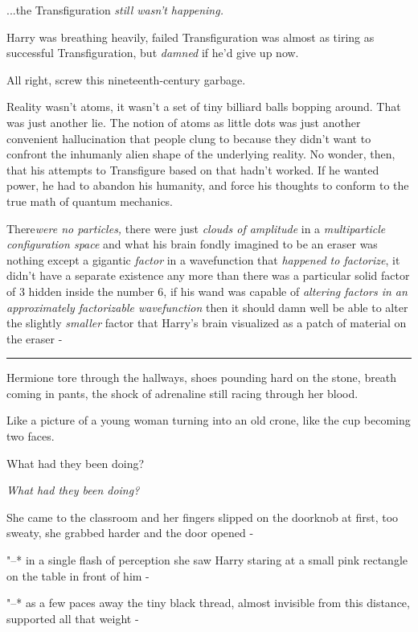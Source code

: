 ...the Transfiguration \emph{still wasn't happening.}

Harry was breathing heavily, failed Transfiguration was almost as tiring
as successful Transfiguration, but \emph{damned} if he'd give up now.

All right, screw this nineteenth-century garbage.

Reality wasn't atoms, it wasn't a set of tiny billiard balls bopping
around. That was just another lie. The notion of atoms as little dots
was just another convenient hallucination that people clung to because
they didn't want to confront the inhumanly alien shape of the underlying
reality. No wonder, then, that his attempts to Transfigure based on that
hadn't worked. If he wanted power, he had to abandon his humanity, and
force his thoughts to conform to the true math of quantum mechanics.

There\emph{were no particles,} there were just \emph{clouds of
amplitude} in a \emph{multiparticle configuration space} and what his
brain fondly imagined to be an eraser was nothing except a gigantic
\emph{factor} in a wavefunction that \emph{happened to factorize}, it
didn't have a separate existence any more than there was a particular
solid factor of 3 hidden inside the number 6, if his wand was capable of
\emph{altering factors in an approximately factorizable wavefunction}
then it should damn well be able to alter the slightly \emph{smaller}
factor that Harry's brain visualized as a patch of material on the
eraser -

\begin{center}\rule{3in}{0.4pt}\end{center}

Hermione tore through the hallways, shoes pounding hard on the stone,
breath coming in pants, the shock of adrenaline still racing through her
blood.

Like a picture of a young woman turning into an old crone, like the cup
becoming two faces.

What had they been doing?

\emph{What had they been doing?}

She came to the classroom and her fingers slipped on the doorknob at
first, too sweaty, she grabbed harder and the door opened -

"--* in a single flash of perception she saw Harry staring at a small pink
rectangle on the table in front of him -

"--* as a few paces away the tiny black thread, almost invisible from this
distance, supported all that weight -

